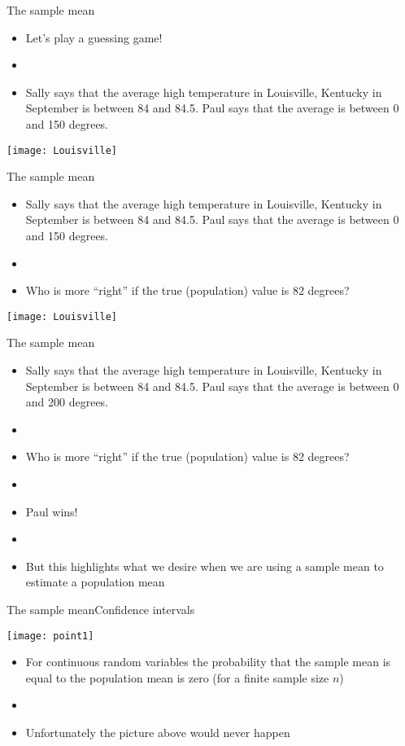 \documentclass[xcolor=dvipsnames]{beamer}
\begin{document}
\begin{frame}{The sample mean}
	\begin{itemize}
		\item Let's play a guessing game!
		\item[] 
		\item Sally says that the average high temperature in Louisville, Kentucky in September is between 84 and 84.5. Paul says that the average is between 0 and 150 degrees.
	\end{itemize}
\begin{center}
	\texttt{[image: Louisville]}
\end{center}
\end{frame}

\begin{frame}{The sample mean}
	\begin{itemize}
		\item Sally says that the average high temperature in Louisville, Kentucky in September is between 84 and 84.5. Paul says that the average is between 0 and 150 degrees.
		\item[]
		\item Who is more ``right'' if the true (population) value is 82 degrees?
	\end{itemize}
	\begin{center}
		\texttt{[image: Louisville]}
	\end{center}
\end{frame}

\begin{frame}{The sample mean}
	\begin{itemize}
		\item Sally says that the average high temperature in Louisville, Kentucky in September is between 84 and 84.5. Paul says that the average is between 0 and 200 degrees.
		\item[]
		\item Who is more ``right'' if the true (population) value is 82 degrees?
		\item[]
		\item Paul wins!
		\item[]
		\item But this highlights what we desire when we are using a sample mean to estimate a population mean
	\end{itemize}
\end{frame}

\begin{frame}{The sample mean}{Confidence intervals}
	\begin{center}
		\texttt{[image: point1]}
	\end{center}
\begin{itemize}
	\item For continuous random variables the probability that the sample mean is equal to the population mean is zero (for a finite sample size $n$)
	\item[]
	\item Unfortunately the picture above would never happen
\end{itemize}
\end{frame}
\end{document}
